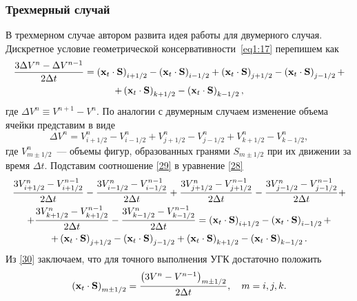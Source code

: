 \subsubsection{Трехмерный случай}
\label{s:1233}
В трехмерном случае автором развита идея работы \cite{demper} для двумерного случая. Дискретное условие
геометрической консервативности~\eqref{eq1:17} перепишем как
\begin{gather}
  \frac{{3\Delta V^n  - \Delta V^{n - 1} }}{{2\Delta t}} = 
  \left({{\bf{x}}_t  \cdot {\bf{S}}} \right)_{i + 1/2} - 
  \left({{\bf{x}}_t  \cdot {\bf{S}}} \right)_{i - 1/2} + 
  \left({{\bf{x}}_t  \cdot {\bf{S}}} \right)_{j + 1/2} - 
  \left({{\bf{x}}_t  \cdot {\bf{S}}} \right)_{j - 1/2} + \notag\\ + 
  \left({{\bf{x}}_t  \cdot {\bf{S}}} \right)_{k + 1/2} - 
  \left({{\bf{x}}_t  \cdot {\bf{S}}} \right)_{k - 1/2} ,
  \label{28}
\end{gather}
где $\Delta V_{}^n \equiv V^{n + 1} - V^n$. По аналогии с двумерным случаем изменение объема ячейки 
представим в виде
\begin{equation}
  \label{29} 
  \Delta V_{}^n = V_{i + 1/2}^n - V_{i - 1/2}^n + V_{j + 1/2}^n - V_{j - 1/2}^n 
  + V_{k + 1/2}^n - V_{k - 1/2}^n,
\end{equation}
где $V_{m \pm 1/2}^n$~--- объемы фигур, образованных гранями $S_{m \pm 1/2}$ при их движении за время 
$\Delta t$. Подставим соотношение \eqref{29} в уравнение \eqref{28}
\begin{gather}
  \frac{3V_{i + 1/2}^n  - V_{i + 1/2}^{n - 1}}{2\Delta t} - 
  \frac{3V_{i - 1/2}^n  - V_{i - 1/2}^{n - 1}}{2\Delta t} +
  \frac{3V_{j + 1/2}^n  - V_{j + 1/2}^{n - 1}}{2\Delta t} - 
  \frac{3V_{j - 1/2}^n  - V_{j - 1/2}^{n - 1}}{2\Delta t} +
  \notag \\ + \frac{3V_{k + 1/2}^n  - V_{k + 1/2}^{n - 1}}{2\Delta t} -  
  \frac{3V_{k - 1/2}^n  - V_{k - 1/2}^{n - 1}}{2\Delta t} =
  \left( {{\bf{x}}_t  \cdot {\bf{S}}} \right)_{i + 1/2} - 
  \left( {{\bf{x}}_t  \cdot {\bf{S}}} \right)_{i - 1/2} +\notag \\ + 
  \left( {{\bf{x}}_t  \cdot {\bf{S}}} \right)_{j + 1/2} - 
  \left( {{\bf{x}}_t  \cdot {\bf{S}}} \right)_{j - 1/2} +  
  \left( {{\bf{x}}_t  \cdot {\bf{S}}} \right)_{k + 1/2} - 
  \left( {{\bf{x}}_t  \cdot {\bf{S}}} \right)_{k - 1/2}.
  \label{30}
\end{gather}
Из \eqref{30} заключаем, что для точного выполнения УГК достаточно положить
\begin{equation}
  \label{31} 
  \left( {{\bf{x}}_t \cdot {\bf{S}}} \right)_{m \pm 1/2} = 
  \frac{\left(3V^n  - V^{n - 1} \right)_{m \pm 1/2}}{{2\Delta t}},\quad m = i,j,k.
\end{equation}

